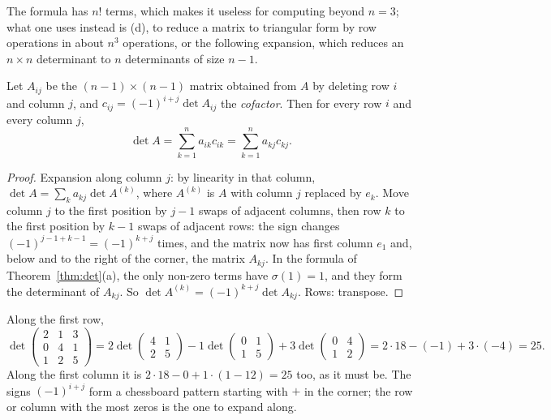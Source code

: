 The formula has $n!$ terms, which makes it useless for computing beyond $n=3$; what one uses instead is (d), to reduce a matrix to triangular form by
row operations in about $n^3$ operations, or the following expansion, which reduces an $n\times n$ determinant to $n$ determinants of size $n-1$.

\begin{propositionx}
Let $A_{ij}$ be the $(n-1)\times(n-1)$ matrix obtained from $A$ by deleting row $i$ and column $j$, and $c_{ij}=(-1)^{i+j}\det A_{ij}$ the \emph{cofactor}. Then for every row $i$ and every column $j$,
\[
\det A=\sum_{k=1}^na_{ik}c_{ik}=\sum_{k=1}^na_{kj}c_{kj}.
\]
\end{propositionx}
\begin{proof}
Expansion along column $j$: by linearity in that column, $\det A=\sum_ka_{kj}\det A^{(k)}$, where $A^{(k)}$ is $A$ with column $j$ replaced by $e_k$. Move column $j$ to the first position by $j-1$ swaps of adjacent columns, then row $k$ to the first position by $k-1$ swaps of adjacent rows: the sign changes $(-1)^{j-1+k-1}=(-1)^{k+j}$ times, and the matrix now has first column $e_1$ and, below and to the right of the corner, the matrix $A_{kj}$. In the formula of Theorem~\ref{thm:det}(a), the only non-zero terms have $\sigma(1)=1$, and they form the determinant of $A_{kj}$. So $\det A^{(k)}=(-1)^{k+j}\det A_{kj}$. Rows: transpose.
\end{proof}

\begin{examplex}
Along the first row,
\[
\det\begin{pmatrix}2&1&3\\0&4&1\\1&2&5\end{pmatrix}=2\det\begin{pmatrix}4&1\\2&5\end{pmatrix}-1\det\begin{pmatrix}0&1\\1&5\end{pmatrix}+3\det\begin{pmatrix}0&4\\1&2\end{pmatrix}=2\cdot18-(-1)+3\cdot(-4)=25.
\]
Along the first column it is $2\cdot18-0+1\cdot(1-12)=25$ too, as it must be. The signs $(-1)^{i+j}$ form a chessboard pattern starting with $+$ in the corner; the row or column with the most zeros is the one to expand along.
\end{examplex}

